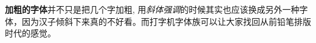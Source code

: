 \documentclass{ctexart}
\begin{document}
{\bfseries 加粗的字体}并不只是把几个字加粗, 用{\itshape 斜体强调}的时候其实也应该换成另外一种字体，因为汉子倾斜下来真的不好看。而{\ttfamily 打字机字体族}可以让大家找回从前铅笔排版时代的感觉。
\end{document}
